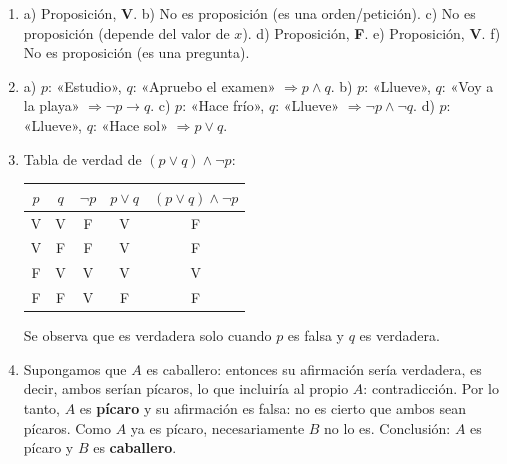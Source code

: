\documentclass[12pt, letterpaper]{article}
\begin{document}
  \begin{enumerate}[leftmargin=*, label=\textbf{\arabic*.}]
    \item a) Proposición, \textbf{V}. \quad b) No es proposición (es una orden/petición).
          \quad c) No es proposición (depende del valor de $x$). \quad d) Proposición, \textbf{F}.
          \quad e) Proposición, \textbf{V}. \quad f) No es proposición (es una pregunta).

    \item a) $p$: «Estudio», $q$: «Apruebo el examen» $\Rightarrow p \wedge q$. \quad
          b) $p$: «Llueve», $q$: «Voy a la playa» $\Rightarrow \neg p \rightarrow q$. \quad
          c) $p$: «Hace frío», $q$: «Llueve» $\Rightarrow \neg p \wedge \neg q$. \quad
          d) $p$: «Llueve», $q$: «Hace sol» $\Rightarrow p \vee q$.

    \item Tabla de verdad de $(p \vee q) \wedge \neg p$:
          \begin{center}
            \begin{tabular}{cc|c|c|c}
              \toprule
              $p$ & $q$ & $\neg p$ & $p \vee q$ & $(p \vee q) \wedge \neg p$ \\
              \midrule
              V   & V   & F        & V          & F                          \\
              V   & F   & F        & V          & F                          \\
              F   & V   & V        & V          & V                          \\
              F   & F   & V        & F          & F                          \\
              \bottomrule
            \end{tabular}
          \end{center}
          Se observa que es verdadera solo cuando $p$ es falsa y $q$ es verdadera.

    \item Supongamos que $A$ es caballero: entonces su afirmación sería verdadera, es decir, ambos serían pícaros, lo que incluiría al propio $A$: contradicción.
          Por lo tanto, $A$ es \textbf{pícaro} y su afirmación es falsa: no es cierto que ambos sean pícaros.
          Como $A$ ya es pícaro, necesariamente $B$ no lo es. Conclusión: $A$ es pícaro y $B$ es \textbf{caballero}.


\end{enumerate}
\end{document}
